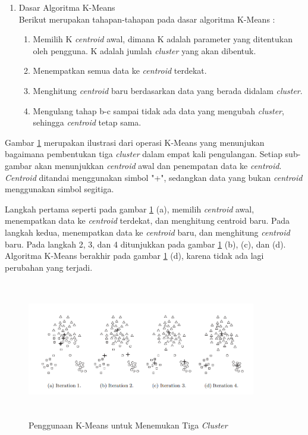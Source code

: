 \begin{enumerate}
    \item Dasar Algoritma K-Means \\
        Berikut merupakan tahapan-tahapan pada dasar algoritma K-Means :
        
        \begin{enumerate}
            \item Memilih K \textit{centroid} awal, dimana K adalah parameter yang ditentukan oleh pengguna. K adalah jumlah \textit{cluster} yang akan dibentuk.
            
            \item Menempatkan semua data ke \textit{centroid} terdekat.
            
            \item Menghitung \textit{centroid} baru berdasarkan data yang berada didalam \textit{cluster}.
            
            \item Mengulang tahap b-c sampai tidak ada data yang mengubah \textit{cluster}, sehingga \textit{centroid} tetap sama.
        \end{enumerate}
\end{enumerate}

Gambar \ref{fig:ilustrasi K-Means} merupakan ilustrasi dari operasi K-Means yang menunjukan bagaimana pembentukan tiga \textit{cluster} dalam empat kali pengulangan. Setiap sub-gambar akan menunjukkan \textit{centroid} awal dan penempatan data ke \textit{centroid}. \textit{Centroid} ditandai menggunakan simbol "+", sedangkan data yang bukan \textit{centroid} menggunakan simbol segitiga. 

Langkah pertama seperti pada gambar \ref{fig:ilustrasi K-Means} (a), memilih \textit{centroid} awal, menempatkan data ke \textit{centroid} terdekat, dan menghitung centroid baru. Pada langkah kedua, menempatkan data ke \textit{centroid} baru, dan menghitung \textit{centroid} baru. Pada langkah 2, 3, dan 4 ditunjukkan pada gambar \ref{fig:ilustrasi K-Means} (b), (c), dan (d). Algoritma K-Means berakhir pada gambar \ref{fig:ilustrasi K-Means} (d), karena tidak ada lagi perubahan yang terjadi.

\begin{figure}[H]
    \centering
    \includegraphics[width= 10cm, height=6cm]{doc/DokumenSkripsi/Gambar/gambar23.PNG}
    \caption{Penggunaan K-Means untuk Menemukan Tiga \textit{Cluster}}
    \label{fig:ilustrasi K-Means}
\end{figure}

